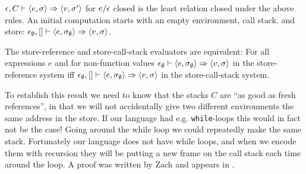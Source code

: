 \begin{definition}
$\epsilon, C \vdash \langle e, \sigma \rangle \Rightarrow \langle v, \sigma' \rangle$ for $e/\epsilon$ closed is the least relation closed under the above rules.  An initial computation starts with an empty environment, call stack, and store: $\epsilon_\emptyset, [] \vdash \langle e, \sigma_\emptyset \rangle \Rightarrow \langle v,\sigma\rangle$.
\end{definition}

\begin{lemma} 
The store-reference and store-call-stack evaluators are equivalent:
 For all expressions $e$ and for non-function values $\epsilon_\emptyset \vdash \langle e, \sigma_\emptyset \rangle\Rightarrow \langle v,\sigma\rangle$ in the store-reference system iff  $\epsilon_\emptyset, [] \vdash \langle e, \sigma_\emptyset \rangle \Rightarrow \langle v,\sigma\rangle$ in the store-call-stack system.
\end{lemma}

To establish this result we need to know that the stacks $C$ are ``as good as fresh references'', in that we will not accidentally give two different environments the same address in the store.  If our language had e.g. {\tt while}-loops this would in fact not be the case!  Going around the while loop we could repeatedly make the same stack.  Fortunately our language does not have while loops, and when we encode them with recursion they will be putting a new frame on the call stack each time around the loop.  A proof was written by Zach and appears in \cite{DDPA}.

